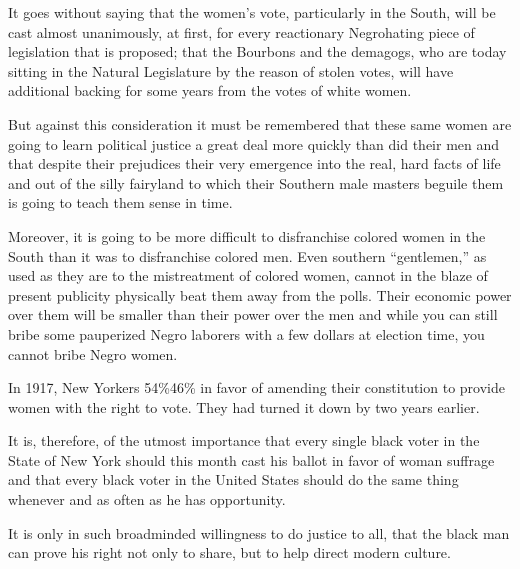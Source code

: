 \documentclass[letterpaper,10pt,english]{jupyterBook}
\begin{document}
\sphinxAtStartPar
It goes without saying that the women’s vote, particularly in the South, will be cast almost unanimously, at first, for every reactionary Negro\sphinxhyphen{}hating piece of legislation that is proposed; that the Bourbons and the demagogs, who are today sitting in the Natural Legislature by the reason of stolen votes, will have additional backing for some years from the votes of white women.

\sphinxAtStartPar
But against this consideration it must be remembered that these same women are going to learn political justice a great deal more quickly than did their men and that despite their prejudices their very emergence into the real, hard facts of life and out of the silly fairy\sphinxhyphen{}land to which their Southern male masters beguile them is going to teach them sense in time.

\sphinxAtStartPar
Moreover, it is going to be more difficult to disfranchise colored women in the South than it was to disfranchise colored men. Even southern “gentlemen,” as used as they are to the mistreatment of colored wom­en, cannot in the blaze of present publicity physically beat them away from the polls. Their economic power over them will be smaller than their power over the men and while you can still bribe some pauperized Negro laborers with a few dollars at election time, you cannot bribe Negro women.

\begin{sphinxShadowBox}
\sphinxstylesidebartitle{}

\sphinxAtStartPar
In 1917, New Yorkers  54\%\sphinxhyphen{}46\% in favor of amending their constitution to provide women with the right to vote. They had turned it down by  two years earlier.
\end{sphinxShadowBox}

\sphinxAtStartPar
It is, therefore, of the utmost importance that every single black voter in the State of New York should this month cast his ballot in favor of woman suffrage and that every black voter in the United States should do the same thing whenever and as often as he has opportunity.

\sphinxAtStartPar
It is only in such broad\sphinxhyphen{}minded willingness to do justice to all, that the black man can prove his right not only to share, but to help direct modern culture.
\end{document}
